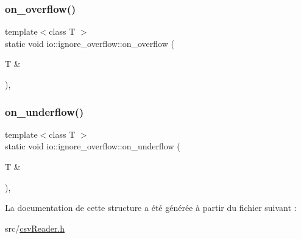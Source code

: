 \subsubsection{\texorpdfstring{on\+\_\+overflow()}{on\_overflow()}}
{\footnotesize\ttfamily template$<$class T $>$ \\
static void io\+::ignore\+\_\+overflow\+::on\+\_\+overflow (\begin{DoxyParamCaption}\item[{T \&}]{ }\end{DoxyParamCaption})\hspace{0.3cm}{\ttfamily [inline]}, {\ttfamily [static]}}

\mbox{\label{structio_1_1ignore__overflow_aece692f7a20933149ec99aa1f97458ad}} 
\subsubsection{\texorpdfstring{on\+\_\+underflow()}{on\_underflow()}}
{\footnotesize\ttfamily template$<$class T $>$ \\
static void io\+::ignore\+\_\+overflow\+::on\+\_\+underflow (\begin{DoxyParamCaption}\item[{T \&}]{ }\end{DoxyParamCaption})\hspace{0.3cm}{\ttfamily [inline]}, {\ttfamily [static]}}



La documentation de cette structure a été générée à partir du fichier suivant \+:\begin{DoxyCompactItemize}
\item 
src/\hyperlink{csvReader_8h}{csv\+Reader.\+h}\end{DoxyCompactItemize}

